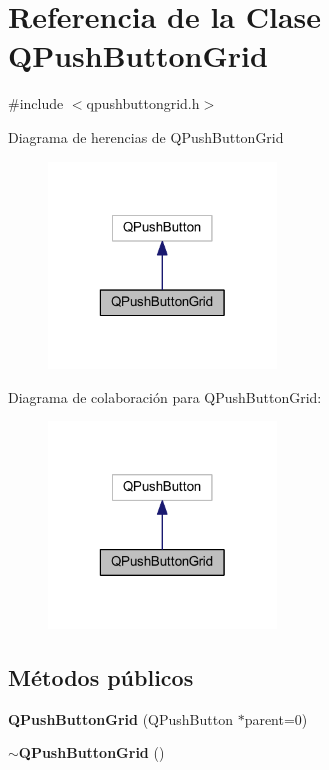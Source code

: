 \section{Referencia de la Clase Q\-Push\-Button\-Grid}
\label{class_q_push_button_grid}


{\ttfamily \#include $<$qpushbuttongrid.\-h$>$}



Diagrama de herencias de Q\-Push\-Button\-Grid
\nopagebreak
\begin{figure}[H]
\begin{center}
\leavevmode
\includegraphics[width=172pt]{class_q_push_button_grid__inherit__graph}
\end{center}
\end{figure}


Diagrama de colaboración para Q\-Push\-Button\-Grid\-:
\nopagebreak
\begin{figure}[H]
\begin{center}
\leavevmode
\includegraphics[width=172pt]{class_q_push_button_grid__coll__graph}
\end{center}
\end{figure}
\subsection*{Métodos públicos}
\begin{DoxyCompactItemize}
\item 
{\bf Q\-Push\-Button\-Grid} (Q\-Push\-Button $\ast$parent=0)
\item 
{\bf $\sim$\-Q\-Push\-Button\-Grid} ()
\end{DoxyCompactItemize}
